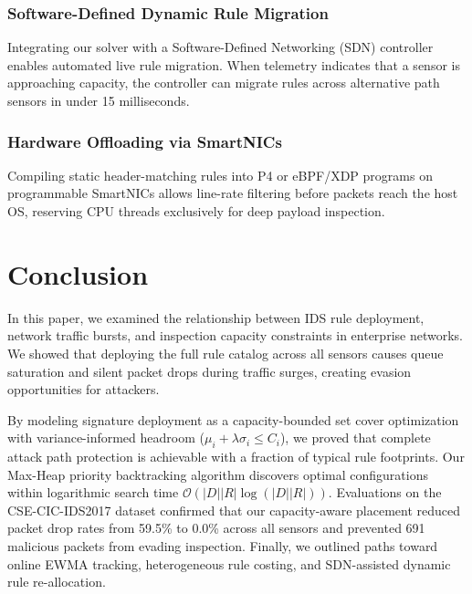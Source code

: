 \documentclass[conference]{IEEEtran}
\begin{document}
\subsubsection{Software-Defined Dynamic Rule Migration}
Integrating our solver with a Software-Defined Networking (SDN) controller enables automated live rule migration. When telemetry indicates that a sensor is approaching capacity, the controller can migrate rules across alternative path sensors in under 15 milliseconds.

\subsubsection{Hardware Offloading via SmartNICs}
Compiling static header-matching rules into P4 or eBPF/XDP programs on programmable SmartNICs allows line-rate filtering before packets reach the host OS, reserving CPU threads exclusively for deep payload inspection.

\section{Conclusion}
\label{sec:conclusion}

In this paper, we examined the relationship between IDS rule deployment, network traffic bursts, and inspection capacity constraints in enterprise networks. We showed that deploying the full rule catalog across all sensors causes queue saturation and silent packet drops during traffic surges, creating evasion opportunities for attackers.

By modeling signature deployment as a capacity-bounded set cover optimization with variance-informed headroom ($\mu_i + \lambda\sigma_i \le C_i$), we proved that complete attack path protection is achievable with a fraction of typical rule footprints. Our Max-Heap priority backtracking algorithm discovers optimal configurations within logarithmic search time $\mathcal{O}(|D||R|\log(|D||R|))$. Evaluations on the CSE-CIC-IDS2017 dataset confirmed that our capacity-aware placement reduced packet drop rates from 59.5\% to 0.0\% across all sensors and prevented 691 malicious packets from evading inspection. Finally, we outlined paths toward online EWMA tracking, heterogeneous rule costing, and SDN-assisted dynamic rule re-allocation.



\end{document}

